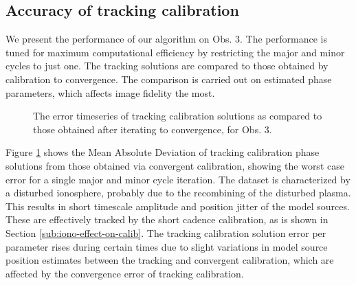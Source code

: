 \documentclass{aa}
\begin{document}
\subsection{Accuracy of tracking calibration}
We present the performance of our  algorithm on Obs. 3. The performance is tuned
for maximum computational  efficiency by restricting the major  and minor cycles
to  just  one.   The  tracking  solutions  are compared  to  those  obtained  by
calibration to  convergence.  The comparison  is carried out on  estimated phase
parameters, which affects image fidelity the most.
\begin{figure}[tbh]

\caption{\label{fig:The-error-timeseries}The error timeseries of tracking
calibration solutions as compared to those obtained after iterating
to convergence, for Obs. 3.}
\end{figure}

Figure  \ref{fig:The-error-timeseries}  shows  the  Mean Absolute  Deviation  of
tracking  calibration  phase  solutions   from  those  obtained  via  convergent
calibration, showing  the worst case  error for a  single major and  minor cycle
iteration. The dataset is characterized  by a disturbed ionosphere, probably due
to  the recombining of  the disturbed  plasma. This  results in  short timescale
amplitude  and position  jitter of  the  model sources.   These are  effectively
tracked   by  the   short  cadence   calibration,   as  is   shown  in   Section
\ref{sub:iono-effect-on-calib}.   The tracking  calibration  solution error  per
parameter rises  during certain times due  to slight variations  in model source
position estimates  between the tracking  and convergent calibration,  which are
affected by the convergence error of tracking calibration.
\end{document}
